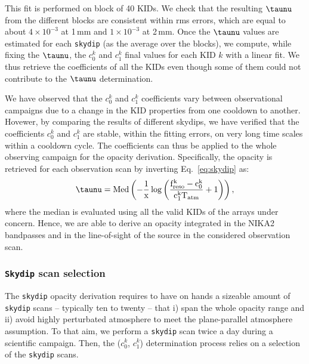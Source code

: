 %
{\lp This fit is performed on block of 40 KIDs. We check that the
resulting $\taunu$ from the different blocks are consistent within rms
errors, which are equal to about $4\times 10^{-3}$ at 1\,mm and
$1\times 10^{-3}$ at 2\,mm.}
Once the $\taunu$ values are estimated for each {\tt skydip} (as the average over the
blocks), we compute, while fixing the $\taunu$, the $c_0^k$ and $c_1^k$
final values for each KID $k$ with a linear fit. We thus retrieve
the coefficients of all the KIDs even though some of them could not
contribute to the $\taunu$ determination. %

{\lp We have observed that the  $c_0^k$ and $c_1^k$ coefficients vary
between observational campaigns due to a change in the KID properties
from one cooldown to another.}
Hovewer, by comparing the results of different skydips, we have verified that the
coefficients $c_0^k$ and $c_1^k$ are stable, within the fitting errors, on very
long time scales within a cooldown cycle. The coefficients can thus be
applied to the whole observing campaign for the opacity derivation. %
Specifically, the opacity %
is retrieved for each observation scan by
inverting Eq.~\ref{eq:skydip} as:
\begin{equation}
\taunu =   \rm{Med}\left( -\frac{1}{x} \log\left( \frac{f_{\rm{reso}}^k - c_0^k}{c_1^kT_{\rm{atm}}} +1 \right)\right), 
\end{equation}
where the median is evaluated using all the valid
KIDs of the arrays under concern. Hence, we are able to derive an opacity
integrated in the NIKA2 bandpasses and in the line-of-sight of the
source in the considered observation scan.

\subsubsection{{\tt Skydip} scan selection}
\label{se:skydip-selection}

The {\tt skydip} opacity derivation requires to have on hands a
sizeable amount of {\tt skydip} scans --
typically ten to twenty -- that i) span the whole opacity range and
ii) avoid highly perturbated atmosphere to meet the plane-parallel
atmosphere assumption. To that aim, we perform a {\tt skydip}
scan twice a day during a scientific campaign. Then, the ($c_0^k$, $c_1^k$)
determination process relies on a selection of the {\tt skydip} scans.

